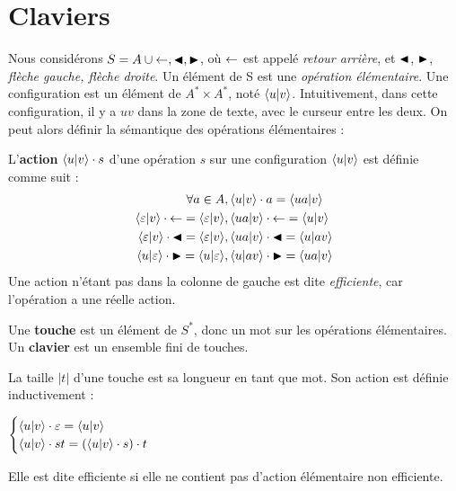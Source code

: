 \documentclass[12pt, a4paper]{article}
\begin{document}
    \section{Claviers}
    Nous considérons $S = A \cup {\mathord{\leftarrow}, \mathord{\blacktriangleleft}, \mathord{\blacktriangleright}}$, où $\mathord{\leftarrow}$ est appelé \emph{retour arrière}, et $\mathord{\blacktriangleleft}$, $\mathord{\blacktriangleright}$, \emph{flèche gauche, flèche droite}.
    Un élément de S est une \emph{opération élémentaire}.
    Une configuration est un élément de $A^* \times A^*$, noté $\left\langle u \middle| v \right\rangle$. Intuitivement, dans cette configuration, il y a $uv$ dans la zone de texte, avec le curseur entre les deux.
    On peut alors définir la sémantique des opérations élémentaires :
    \begin{semopel}
        L'\textbf{action} $\left\langle u \middle| v \right\rangle\cdot s$ d'une opération $s$ sur une configuration $\left\langle u \middle| v \right\rangle$ est définie comme suit :
        \begin{align*}
            \forall a \in A&, \left\langle u \middle| v \right\rangle\cdot a = \left\langle ua \middle| v \right\rangle \\
            \left\langle \varepsilon \middle| v \right\rangle\cdot \mathord{\leftarrow} = \left\langle \varepsilon \middle| v \right\rangle &, \left\langle ua \middle| v \right\rangle\cdot \mathord{\leftarrow} = \left\langle u \middle| v \right\rangle \\
            \left\langle \varepsilon \middle| v \right\rangle\cdot \mathord{\blacktriangleleft} = \left\langle \varepsilon \middle| v \right\rangle &, \left\langle ua \middle| v \right\rangle\cdot \mathord{\blacktriangleleft} = \left\langle u \middle| av \right\rangle \\
            \left\langle u \middle| \varepsilon \right\rangle\cdot \mathord{\blacktriangleright} = \left\langle u \middle| \varepsilon \right\rangle &, \left\langle u \middle| av \right\rangle\cdot \mathord{\blacktriangleright} = \left\langle ua \middle| v \right\rangle \\
        \end{align*}
        Une action n'étant pas dans la colonne de gauche est dite \emph{efficiente}, car l'opération a une réelle action.
    \end{semopel}
    \begin{clavier}
        Une \textbf{touche} est un élément de $S^*$, donc un mot sur les opérations élémentaires. \\
        Un \textbf{clavier} est un ensemble fini de touches.
    \end{clavier}
    La taille $|t|$ d'une touche est sa longueur en tant que mot. Son action est définie inductivement :

    $\begin{cases}
        \left\langle u \middle| v \right\rangle\cdot \varepsilon = \left\langle u \middle| v \right\rangle \\
        \left\langle u \middle| v \right\rangle\cdot st = (\left\langle u \middle| v \right\rangle\cdot s) \cdot t
    \end{cases}$

    Elle est dite efficiente si elle ne contient pas d'action élémentaire non efficiente.
\end{document}

